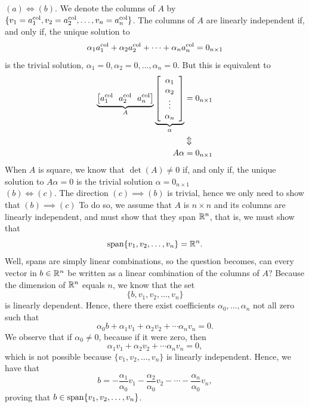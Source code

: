 $(a) \iff (b)$. 
We denote the columns of $A$ by $\{v_1=a^{\rm col}_1, v_2=a^{\rm col}_2, \ldots, v_n=a^{\rm col}_n \}$. The columns of $A$ are linearly independent if, and only if, the unique solution to
\begin{equation}
    \label{eq:LinearIdepForBasisProof}
    \alpha_1 a^{\rm col}_1 +  \alpha_2 a^{\rm col}_2 + \cdots + \alpha_n a^{\rm col}_n = 0_{n \times 1}
\end{equation}
is the trivial solution, $\alpha_1=0, \alpha_2=0, \ldots, \alpha_n=0$.
But this is equivalent to
\begin{align*}
   \underbrace{ \left[ a^{\rm col}_1 ~~a^{\rm col}_2~~a^{\rm col}_n \right]}_{A} \underbrace{\left[\begin{array}{c} \alpha_1 \\ \alpha_2 \\ \vdots \\ \alpha_n  \end{array}  \right]}_{\alpha} &= 0_{n \times 1}\\
   & \Updownarrow \\
   A \alpha &= 0_{n \times 1}
\end{align*}
When $A$ is square, we know that $\det(A) \neq 0$ if, and only if, the unique solution to $A\alpha = 0$ is the trivial solution $\alpha = 0_{n \times 1}$\\

 $(b) \iff (c)$. The direction $(c) \implies (b)$ is trivial, hence we only need to show that  $(b) \implies (c)$ To do so, we assume that $A$ is $n \times n$ and its columns are linearly independent, and must show that they span $\mathbb R^n$, that is, we must show that
$$\mathrm{span} \{  v_1, v_2,  \ldots, v_n \}= \mathbb R^n. $$
Well, spans are simply linear combinations, so the question becomes, can every vector in $b \in \mathbb R^n$ be written as a linear combination of the columns of $A$? Because the dimension of $\mathbb R^n$ equals $n$, we know that the set 
$$\{b,  v_1, v_2,  \ldots, v_n  \} $$
is linearly dependent. Hence, there there exist coefficients $\alpha_0,  \ldots, \alpha_n$ not all zero such that 
$$ \alpha_0 b + \alpha_1 v_1 + \alpha_2 v_2 + \cdots \alpha_n v_n =0.$$
We observe that if $\alpha_0 \neq 0$, because if it were zero, then
$$ \alpha_1 v_1 + \alpha_2 v_2 + \cdots \alpha_n v_n =0,$$
which is not possible because $\{ v_1, v_2,  \ldots, v_n\}$ is linearly independent. Hence, we have that
$$ b=-\frac{\alpha_1}{\alpha_0} v_1 -\frac{\alpha_2}{\alpha_0} v_2 - \cdots -\frac{\alpha_n}{\alpha_0} v_n,$$
proving that $b \in \mathrm{span} \{  v_1, v_2,  \ldots, v_n \}$.
\Qed 


